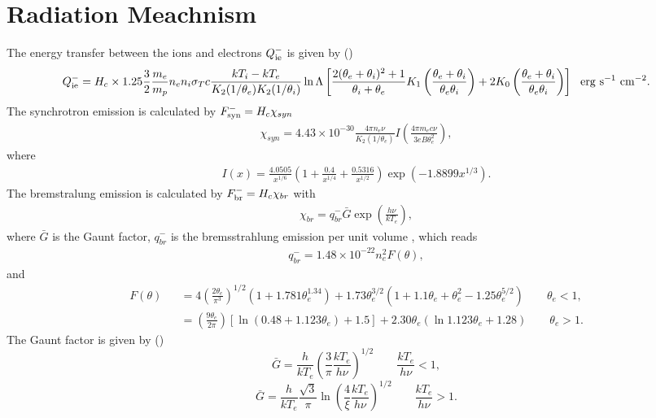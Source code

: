 \documentclass[oneside]{book}
\begin{document}
\section{Radiation Meachnism}
The energy transfer between the ions and electrons $Q_{\rm ie}^-$ is given by (\citealt{Narayan1995})
\begin{equation}
Q_{\rm ie}^-=H_c\times1.25\frac{3}{2}\frac{m_e}{m_p}
n_en_i\sigma_T c\frac{kT_i-kT_e}{K_2(1/\theta_e)K_2(1/\theta_i)}\ln\Lambda
\left[\frac{2(\theta_e+\theta_i)^2+1}{\theta_i+\theta_e}K_1\left(\frac{\theta_e+\theta_i}{\theta_e\theta_i}\right)
+2K_0\left(\frac{\theta_e+\theta_i}{\theta_e\theta_i}\right)\right]~~{\rm erg~s^{-1}~cm^{-2}}.
\end{equation}
The synchrotron emission is calculated by $F_{\rm syn}^-=H_c \chi_{syn}$
\begin{eqnarray}
\chi_{syn}=4.43\times10^{-30}\frac{4\pi n_e\nu}{K_2(1/\theta_e)}
I\left(\frac{4\pi m_ec\nu}{3eB\theta_e^2}\right),
\end{eqnarray}
where
\begin{eqnarray}
I(x)=\frac{4.0505}{x^{1/6}}\left(1+\frac{0.4}{x^{1/4}}+\frac{0.5316}{x^{1/2}}\right)
\exp(-1.8899x^{1/3}).
\end{eqnarray}
The bremstralung emission is calculated  by $F_{\rm br}^-=H_c \chi_{br}$ with
\begin{eqnarray}
\chi_{br}=q_{br}^{-}\bar G\exp\left(\frac{h\nu}{kT_e}\right),
\end{eqnarray}
where $\bar G$ is the Gaunt factor, $q_{br}^{-}$ is the bremsstrahlung emission per unit volume
, which reads
\begin{eqnarray}
q_{br}^{-}=1.48\times10^{-22}n_e^2F(\theta),
\end{eqnarray}
and 
\begin{eqnarray}
F(\theta)&&=4\left(\frac{2\theta_e}{\pi^3}\right)^{1/2}(1+1.781\theta_e^{1.34})
+1.73\theta_e^{3/2}(1+1.1\theta_e+\theta_e^2-1.25\theta_e^{5/2})\qquad\theta_e<1,\nonumber\\
&&=\left(\frac{9\theta_e}{2\pi}\right)[\ln(0.48+1.123\theta_e)+1.5]
+2.30\theta_e(\ln1.123\theta_e+1.28)\qquad\theta_e>1.
\end{eqnarray}
The Gaunt factor is given by (\citealt{Rybicki1979})
\begin{equation}
\bar G=\frac{h}{kT_e}\left(\frac{3}{\pi}\frac{kT_e}{h\nu}\right)^{1/2}\qquad \frac{kT_e}{h\nu}<1,
\end{equation}
\begin{equation}
\bar G=\frac{h}{kT_e}\frac{\sqrt{3}}{\pi}\ln\left(\frac{4}{\xi}\frac{kT_e}{h\nu}\right)^{1/2}
\qquad \frac{kT_e}{h\nu}>1.
\end{equation}
\end{document}
